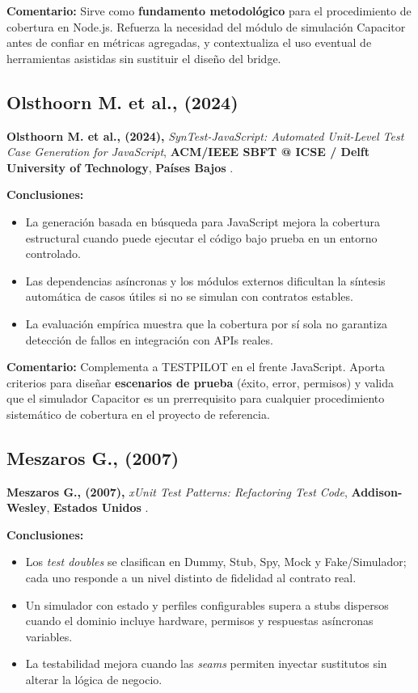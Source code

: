 \textbf{Comentario:} Sirve como \textbf{fundamento metodológico} para el procedimiento de cobertura en Node.js. Refuerza la necesidad del módulo de simulación Capacitor antes de confiar en métricas agregadas, y contextualiza el uso eventual de herramientas asistidas sin sustituir el diseño del bridge.

\subsection{Olsthoorn M. et al., (2024)}
\label{sec:antecedente_olsthoorn}

\textbf{Olsthoorn M. et al., (2024),} \textit{SynTest-JavaScript: Automated Unit-Level Test Case Generation for JavaScript}, \textbf{ACM/IEEE SBFT @ ICSE / Delft University of Technology}, \textbf{Países Bajos} \cite{olsthoorn2024syntest_javascript}.

\textbf{Conclusiones:}
\begin{itemize}
    \item La generación basada en búsqueda para JavaScript mejora la cobertura estructural cuando puede ejecutar el código bajo prueba en un entorno controlado.
    \item Las dependencias asíncronas y los módulos externos dificultan la síntesis automática de casos útiles si no se simulan con contratos estables.
    \item La evaluación empírica muestra que la cobertura por sí sola no garantiza detección de fallos en integración con APIs reales.
\end{itemize}

\textbf{Comentario:} Complementa a TESTPILOT en el frente JavaScript. Aporta criterios para diseñar \textbf{escenarios de prueba} (éxito, error, permisos) y valida que el simulador Capacitor es un prerrequisito para cualquier procedimiento sistemático de cobertura en el proyecto de referencia.

\subsection{Meszaros G., (2007)}
\label{sec:antecedente_meszaros}

\textbf{Meszaros G., (2007),} \textit{xUnit Test Patterns: Refactoring Test Code}, \textbf{Addison-Wesley}, \textbf{Estados Unidos} \cite{meszaros2007xunit}.

\textbf{Conclusiones:}
\begin{itemize}
    \item Los \textit{test doubles} se clasifican en Dummy, Stub, Spy, Mock y Fake/Simulador; cada uno responde a un nivel distinto de fidelidad al contrato real.
    \item Un simulador con estado y perfiles configurables supera a stubs dispersos cuando el dominio incluye hardware, permisos y respuestas asíncronas variables.
    \item La testabilidad mejora cuando las \textit{seams} permiten inyectar sustitutos sin alterar la lógica de negocio.
\end{itemize}

